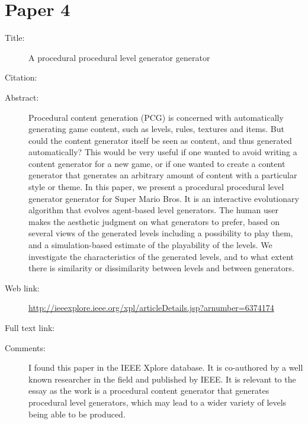 \documentclass{scrartcl}
\begin{document}
\section*{Paper 4}
\begin{description}
\item[Title:] A procedural procedural level generator generator
\item[Citation:] \cite{kerssemakers:procedural}
\item[Abstract:] Procedural content generation (PCG) is concerned with automatically generating game content, such as levels, rules, textures and items. But could the content generator itself be seen as content, and thus generated automatically? This would be very useful if one wanted to avoid writing a content generator for a new game, or if one wanted to create a content generator that generates an arbitrary amount of content with a particular style or theme. In this paper, we present a procedural procedural level generator generator for Super Mario Bros. It is an interactive evolutionary algorithm that evolves agent-based level generators. The human user makes the aesthetic judgment on what generators to prefer, based on several views of the generated levels including a possibility to play them, and a simulation-based estimate of the playability of the levels. We investigate the characteristics of the generated levels, and to what extent there is similarity or dissimilarity between levels and between generators.
\item[Web link:] \url{http://ieeexplore.ieee.org/xpl/articleDetails.jsp?arnumber=6374174}
\item[Full text link:] \url{}
\item[Comments:] I found this paper in the IEEE Xplore database. It is co-authored by a well known researcher in the field and published by IEEE. It is relevant to the essay as the work is a procedural content generator that generates procedural level generators, which may lead to a wider variety of levels being able to be produced.
\end{description}
\end{document}
